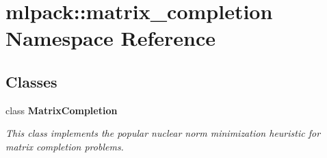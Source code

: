 \section{mlpack\+:\+:matrix\+\_\+completion Namespace Reference}
\label{namespacemlpack_1_1matrix__completion}
\subsection*{Classes}
\begin{DoxyCompactItemize}
\item 
class \textbf{ Matrix\+Completion}
\begin{DoxyCompactList}\small\item\em This class implements the popular nuclear norm minimization heuristic for matrix completion problems. \end{DoxyCompactList}\end{DoxyCompactItemize}
